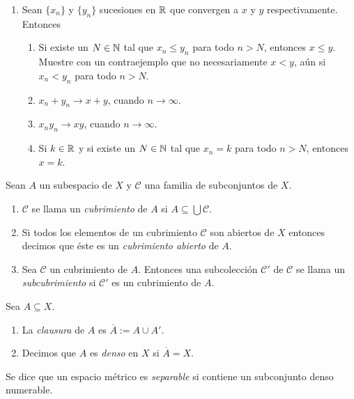 \begin{enumerate}
    \item Sean $\{x_n\}$ y $\{y_n\}$ sucesiones en $\mathbb{R}$ que convergen a $x$ y $y$ respectivamente. Entonces
    \begin{enumerate}
        \item[a)] Si existe un $N \in \mathbb{N}$ tal que $x_n \leq y_n$ para todo $n > N$, entonces $x \leq y$. Muestre con un contraejemplo que no necesariamente $x < y$, aún si $x_n < y_n$ para todo $n > N$.
        \item[b)] $x_n + y_n \to x + y$, cuando $n \to \infty$.
        \item[c)] $x_n y_n \to xy$, cuando $n \to \infty$.
        \item[d)] Si $k \in \mathbb{R}$ y si existe un $N \in \mathbb{N}$ tal que $x_n = k$ para todo $n > N$, entonces $x = k$.
    \end{enumerate}
\end{enumerate}



    \begin{definicion}
    Sean $A$ un subespacio de $X$ y $\mathcal{C}$ una familia de subconjuntos de $X$.
    \begin{enumerate}
        \item $\mathcal{C}$ se llama un \textit{cubrimiento} de $A$ si $A \subseteq \bigcup \mathcal{C}$.
        \item Si todos los elementos de un cubrimiento $\mathcal{C}$ son abiertos de $X$ entonces decimos que éste es un \textit{cubrimiento abierto} de $A$.
        \item Sea $\mathcal{C}$ un cubrimiento de $A$. Entonces una subcolección $\mathcal{C}'$ de $\mathcal{C}$ se llama un \textit{subcubrimiento} si $\mathcal{C}'$ es un cubrimiento de $A$.
    \end{enumerate}
    \end{definicion}

    \begin{definicion}
    Sea $A \subseteq X$.
    \begin{enumerate}
        \item La \textit{clausura} de $A$ es $\overline{A} := A \cup A'$.
        \item Decimos que $A$ es \textit{denso} en $X$ si $\overline{A} = X$.
    \end{enumerate}
    \end{definicion}

    \begin{definicion}
    Se dice que un espacio métrico es \textit{separable} si contiene un subconjunto denso numerable.
    \end{definicion}

